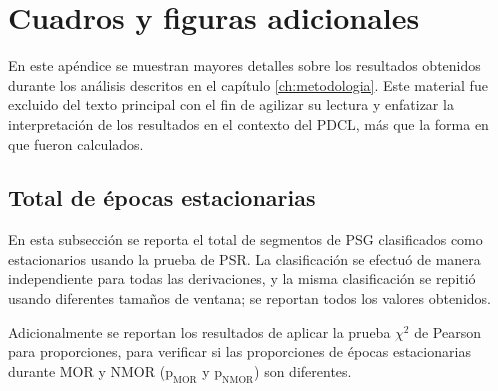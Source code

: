 \documentclass[12pt,letterpaper]{book}
\begin{document}

\chapter{Cuadros y figuras adicionales}
\label{apendiceA}

En este apéndice se muestran mayores detalles sobre los resultados obtenidos durante los análisis descritos en el capítulo \ref{ch:metodologia}.
%
Este material fue excluido del texto principal con el fin de agilizar su lectura y enfatizar la interpretación de los resultados en el contexto del PDCL, más que la forma en que fueron calculados.


\section{Total de épocas estacionarias}

En esta subsección se reporta el total de segmentos de PSG clasificados como estacionarios usando la prueba de PSR.
%
La clasificación se efectuó de manera independiente para todas las derivaciones, y 
la misma clasificación se repitió usando diferentes tamaños de ventana; se reportan todos los valores obtenidos.

Adicionalmente se reportan los resultados de aplicar la prueba $\chi^2$ de Pearson para proporciones, para verificar si las proporciones de épocas estacionarias durante MOR y NMOR ($\text{p}_{\text{MOR}}$ y $\text{p}_{\text{NMOR}}$) son diferentes.
\end{document}
